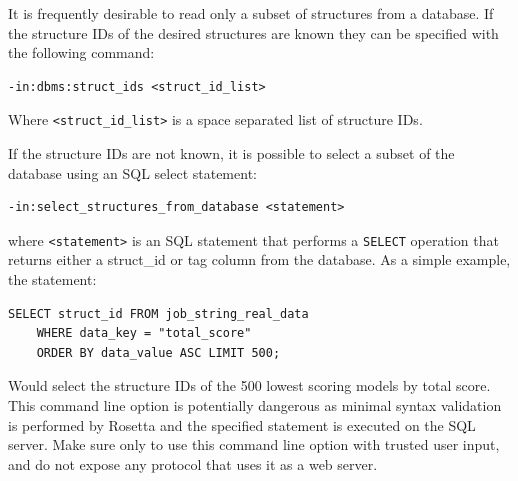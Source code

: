 It is frequently desirable to read only a subset of structures from a database. 
If the structure IDs of the desired structures are known they can be specified with the following command:

\singlespace
\begin{Verbatim}
-in:dbms:struct_ids <struct_id_list>
\end{Verbatim}
\doublespace

Where \texttt{<struct\_id\_list>} is a space separated list of structure IDs.

If the structure IDs are not known, it is possible to select a subset of the database using an SQL select statement:

\singlespace
\begin{Verbatim}
-in:select_structures_from_database <statement>
\end{Verbatim}
\doublespace

where \texttt{<statement>} is an SQL statement that performs a \texttt{SELECT} operation that returns either a struct\_id or tag column from the database.  As a simple example, the statement:

\singlespace
\begin{Verbatim}
SELECT struct_id FROM job_string_real_data 
	WHERE data_key = "total_score" 
	ORDER BY data_value ASC LIMIT 500;
\end{Verbatim}
\doublespace

Would select the structure IDs of the 500 lowest scoring models by total score.
This command line option is potentially dangerous as minimal syntax validation is performed by Rosetta and the specified statement is executed on the SQL server.
Make sure only to use this command line option with trusted user input, and do not expose any protocol that uses it as a web server.